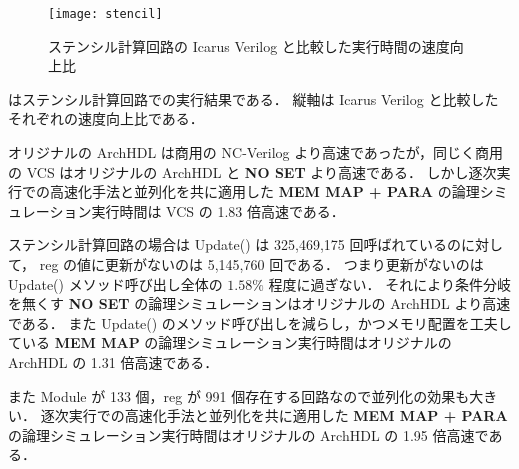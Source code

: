 \fi

\begin{figure}[tb]
 \centering
 \texttt{[image: stencil]}
 \caption{ステンシル計算回路の Icarus Verilog と比較した実行時間の速度向上比}
 \label{fig:stencil}
\end{figure}

 はステンシル計算回路での実行結果である．
縦軸は Icarus Verilog と比較したそれぞれの速度向上比である．

オリジナルの ArchHDL は商用の NC-Verilog より高速であったが，同じく商用の VCS はオリジナルの ArchHDL と \textbf{NO SET} より高速である．
しかし逐次実行での高速化手法と並列化を共に適用した \textbf{MEM MAP + PARA} の論理シミュレーション実行時間は VCS の 1.83 倍高速である．

ステンシル計算回路の場合は Update() は 325,469,175 回呼ばれているのに対して，
reg の値に更新がないのは 5,145,760 回である．
つまり更新がないのは Update() メソッド呼び出し全体の $1.58\%$ 程度に過ぎない．
それにより条件分岐を無くす \textbf{NO SET} の論理シミュレーションはオリジナルの ArchHDL より高速である．
また Update() のメソッド呼び出しを減らし，かつメモリ配置を工夫している \textbf{MEM MAP} の論理シミュレーション実行時間はオリジナルの ArchHDL の 1.31 倍高速である．

また Module が 133 個，reg が 991 個存在する回路なので並列化の効果も大きい．
逐次実行での高速化手法と並列化を共に適用した \textbf{MEM MAP + PARA} の論理シミュレーション実行時間はオリジナルの ArchHDL の 1.95 倍高速である．


